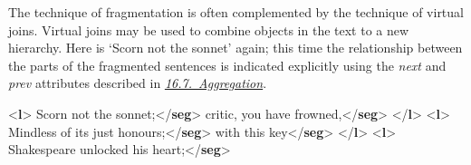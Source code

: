 The technique of fragmentation is often complemented by the technique of virtual joins. Virtual joins may be used to combine objects in the text to a new hierarchy. Here is ‘Scorn not the sonnet’ again; this time the relationship between the parts of the fragmented sentences is indicated explicitly using the {\itshape next} and {\itshape prev} attributes described in \textit{\hyperref[SAAG]{16.7.\ Aggregation}}. \par\bgroup{}\exampleFont \begin{shaded}\noindent\mbox{}{<\textbf{l}>}\mbox{}\newline 
{}Scorn not the sonnet;{</\textbf{seg}>}\mbox{}\newline 
{}critic, you have frowned,{</\textbf{seg}>}\mbox{}\newline 
{</\textbf{l}>}\mbox{}\newline 
{<\textbf{l}>}\mbox{}\newline 
{}Mindless of its just honours;{</\textbf{seg}>}\mbox{}\newline 
{}with this key{</\textbf{seg}>}\mbox{}\newline 
{</\textbf{l}>}\mbox{}\newline 
{<\textbf{l}>}\mbox{}\newline 
{}Shakespeare unlocked his heart;{</\textbf{seg}>}\mbox{}\newline 

\end{shaded}
